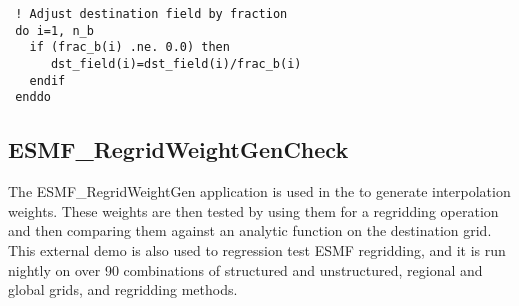 \begin{verbatim}
 ! Adjust destination field by fraction
 do i=1, n_b
   if (frac_b(i) .ne. 0.0) then
      dst_field(i)=dst_field(i)/frac_b(i)
   endif
 enddo
\end{verbatim}


\subsection{ESMF\_RegridWeightGenCheck}\label{sec:regridweightgencheck}

The ESMF\_RegridWeightGen application is used in the
 to generate interpolation weights.  These weights are then tested by using them for a regridding operation and then comparing them against an analytic function on the destination grid.  This external demo is also used to regression test ESMF regridding, and it is run nightly on over 90 combinations of structured and unstructured, regional and global grids, and regridding methods.
